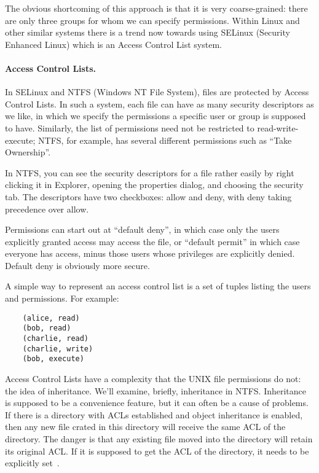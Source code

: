 The obvious shortcoming of this approach is that it is very coarse-grained: there are only three groups for whom we can specify permissions. Within Linux and other similar systems there is a trend now towards using SELinux (Security Enhanced Linux) which is an Access Control List system.

\paragraph{Access Control Lists.}
In SELinux and NTFS (Windows NT File System), files are protected by Access Control Lists. In such a system, each file can have as many security descriptors as we like, in which we specify the permissions a specific user or group is supposed to have. Similarly, the list of permissions need not be restricted to read-write-execute; NTFS, for example, has several different permissions such as ``Take Ownership''.

In NTFS, you can see the security descriptors for a file rather easily by right clicking it in Explorer, opening the properties dialog, and choosing the security tab. The descriptors have two checkboxes: allow and deny, with deny taking precedence over allow.

Permissions can start out at ``default deny'', in which case only the users explicitly granted access may access the file, or ``default permit'' in which case everyone has access, minus those users whose privileges are explicitly denied. Default deny is obviously more secure.

A simple way to represent an access control list is a set of tuples listing the users and permissions. For example:
\begin{verbatim}
	(alice, read)
	(bob, read)
	(charlie, read)
	(charlie, write)
	(bob, execute)
\end{verbatim}

Access Control Lists have a complexity that the UNIX file permissions do not: the idea of inheritance. We'll examine, briefly, inheritance in NTFS. Inheritance is supposed to be a convenience feature, but it can often be a cause of problems. If there is a directory with ACLs established and object inheritance is enabled, then any new file crated in this directory will receive the same ACL of the directory. The danger is that any existing file moved into the directory will retain its original ACL. If it is supposed to get the ACL of the directory, it needs to be explicitly set~\cite{ntfsacl}.



